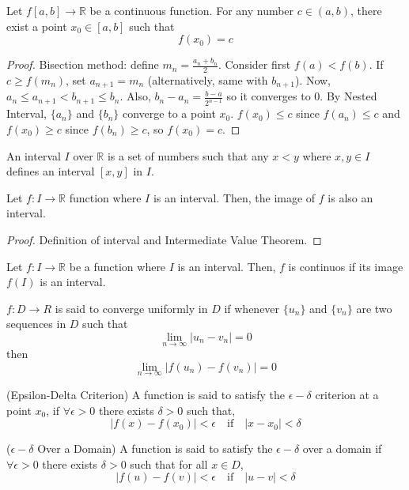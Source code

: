 \documentclass{article}
\begin{document}
\begin{theorem}
    Let $f[a,b]\rightarrow \mathbb{R}$ be a continuous function. For any number
    $c\in(a,b)$, there exist a point $x_0\in [a,b]$ such that
    \[f(x_0) = c\]
\end{theorem}

\begin{proof}
    Bisection method: define $m_n = \frac{a_n+b_n}{2}$. Consider first
    $f(a) < f(b)$. If $c\geq f(m_n)$, set $a_{n+1} = m_n$ (alternatively,
    same with $b_{n+1}$). Now, $a_n\leq a_{n+1} < b_{n+1} \leq b_n$.
    Also, $b_n-a_n = \frac{b-a}{2^{n-1}}$ so it converges to 0. By
    Nested Interval, $\{a_n\}$ and $\{b_n\}$ converge to a point $x_0$.
    $f(x_0) \leq c$ since $f(a_n) \leq c$ and $f(x_0) \geq c$ since 
    $f(b_n) \geq c$, so $f(x_0) = c$.
\end{proof}

\begin{definition}
    An interval $I$ over $\mathbb{R}$ is a set of numbers such that any
    $x<y$ where $x,y\in I$ defines an interval $[x,y]$ in $I$.
\end{definition}

\begin{theorem}
    Let $f:I\rightarrow \mathbb{R}$ function where $I$ is an interval.
    Then, the image of $f$ is also an interval.
\end{theorem}

\begin{proof}
    Definition of interval and Intermediate Value Theorem.
\end{proof}

\begin{theorem}
    Let $f:I\rightarrow \mathbb{R}$ be a function where $I$ is
    an interval. Then, $f$ is continuos if its image $f(I)$ is an
    interval.
\end{theorem}

\begin{definition}
    $f:D\rightarrow R$ is said to converge uniformly in $D$ if whenever
    $\{u_n\}$ and $\{v_n\}$ are two sequences in $D$ such that
    \[\lim_{n\rightarrow \infty} |u_n-v_n| = 0\]
    then
    \[\lim_{n\rightarrow \infty} |f(u_n) - f(v_n)| =0\]
\end{definition}

\begin{definition}
    (Epsilon-Delta Criterion)
    A function is said to satisfy the $\epsilon-\delta$ criterion at a point $x_0$, if
    $\forall \epsilon>0$ there exists $\delta>0$ such that, 
    \[ |f(x) - f(x_0)| < \epsilon \quad \textrm{if} \quad |x-x_0|<\delta\]
    
    ($\epsilon-\delta$ Over a Domain)
    A function is said to satisfy the $\epsilon-\delta$ over a domain if $\forall \epsilon>0$
    there exists $\delta>0$ such that for all $x\in D$,
    \[ |f(u) - f(v)| < \epsilon \quad \textrm{if} \quad |u-v|<\delta\]
\end{definition}
\end{document}

